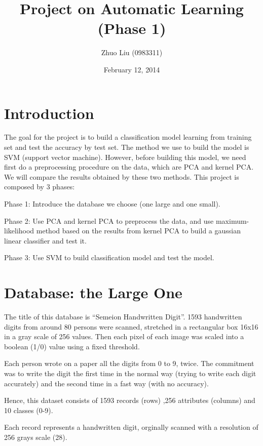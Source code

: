 \documentclass{article}
\author{Zhuo Liu (0983311)}
\title{Project on Automatic Learning (Phase 1)}
\date{February 12, 2014}
\begin{document}
\maketitle


\section{Introduction}

The goal for the project is to build a classification model learning from training set and test the accuracy by test set. 
The method we use to build the model is SVM (support vector machine). However, before building this model, we need first do a preprocessing
procedure on the data, which are PCA and kernel PCA. We will compare the results obtained by these two methods.
This project is composed by 3 phases:

\noindent Phase 1: Introduce the database we choose (one large and one small).

\noindent Phase 2: Use PCA and kernel PCA to preprocess the data, and use maximum-likelihood method based on the results from kernel PCA to build
                   a gaussian linear classifier and test it.

\noindent Phase 3: Use SVM to build classification model and test the model.

\goodbreak

\section{Database: the Large One}

The title of this database is ``Semeion Handwritten Digit''. 1593 handwritten digits from around 80 persons were scanned, stretched in 
a rectangular box 16x16 in a gray scale of 256 values. Then each pixel of each image was scaled into a boolean (1/0) value using a fixed threshold.

Each person wrote on a paper all the digits from 0 to 9, twice. The commitment was to write the digit the first time in the normal way 
(trying to write each digit accurately) and the second time in a fast way (with no accuracy).

Hence, this dataset consists of 1593 records (rows) ,256 attributes (columns) and 10 classes (0-9).

Each record represents a handwritten digit, orginally scanned with a resolution of 256 grays scale (28).
\end{document}
